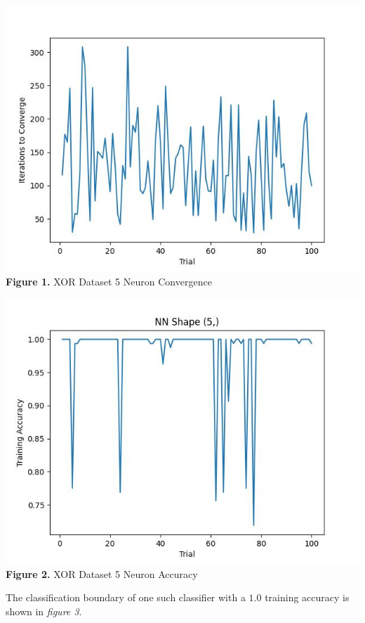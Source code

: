\documentclass[11pt]{article}
\begin{document}
\includegraphics{figures/xor_5_conv.jpg}\\
\textbf{Figure 1.} XOR Dataset 5 Neuron Convergence

\includegraphics{figures/xor_5_acc.jpg}\\
\textbf{Figure 2.} XOR Dataset 5 Neuron Accuracy

The classification boundary of one such classifier with a \(1.0\)
training accuracy is shown in \emph{figure 3}.
\end{document}
